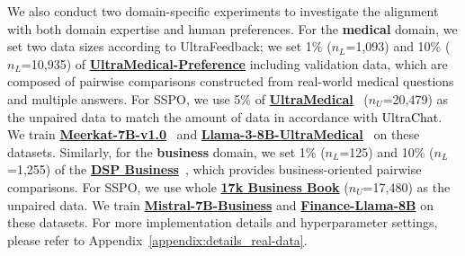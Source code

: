 \documentclass{article} %
\newcommand\fix[1]{\textcolor{black}{#1}}
\newcommand\turnitin[1]{\textcolor{black}{#1}}
\newcommand\rebuttal[1]{\textcolor{black}{#1}}
\begin{document}
We also conduct two domain-specific experiments to investigate the alignment with both domain expertise and human preferences. For the \textbf{medical} domain, we set two data sizes according to UltraFeedback; we set 1\% ($n_L$=1,093) and 10\% ($n_L$=10,935) of \href{https://huggingface.co/datasets/TsinghuaC3I/UltraMedical-Preference}{\textbf{UltraMedical-Preference}} including validation data, which are composed of pairwise comparisons constructed from real-world medical questions and multiple answers. For SSPO, we use 5\% of \href{https://huggingface.co/datasets/TsinghuaC3I/UltraMedical}{\textbf{UltraMedical}}~\citep{zhang2024ultramedical} ($n_U$=20,479) as the unpaired data to match the amount of data in accordance with \fix{UltraChat}. We train \href{https://huggingface.co/dmis-lab/meerkat-7b-v1.0}{\textbf{Meerkat-7B-v1.0}}~\citep{kim2024meerkat} and \href{https://huggingface.co/TsinghuaC3I/Llama-3-8B-UltraMedical}{\textbf{Llama-3-8B-UltraMedical}}~\citep{zhang2024ultramedical} on these datasets. Similarly, for the \textbf{business} domain, we set 1\% ($n_L$=125) and 10\% ($n_L$=1,255) of the \href{https://github.com/Linear95/DSP}{\textbf{DSP Business}}~\citep{cheng2023dsp}, which provides business-oriented pairwise comparisons. For SSPO, we use whole \href{https://huggingface.co/datasets/theoldmandthesea/17k_business_book}{\textbf{17k Business Book}} ($n_U$=17,480) as the unpaired data. We train \href{https://huggingface.co/VijayRam1812/Mistral-7B-Business}{\textbf{Mistral-7B-Business}} and \href{https://huggingface.co/tarun7r/Finance-LLaMA-8B}{\textbf{Finance-Llama-8B}} on these datasets. For more implementation details and hyperparameter settings, please refer to Appendix~\ref{appendix:details_real-data}.
\end{document}
